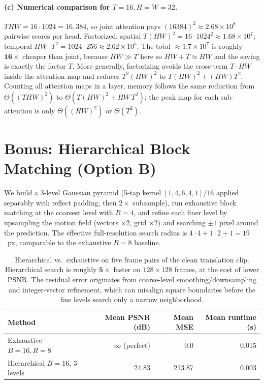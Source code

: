 \documentclass[10pt,a4paper]{article}
\begin{document}
\paragraph{(c) Numerical comparison for $T{=}16, H{=}W{=}32$.}
$THW = 16{\cdot}1024 = 16{,}384$, so joint attention pays $(16384)^2 \approx 2.68\!\times\!10^8$ pairwise scores per head. Factorized: spatial $T(HW)^2 = 16\cdot 1024^2 \approx 1.68\!\times\!10^7$; temporal $HW\cdot T^2 = 1024\cdot 256 \approx 2.62\!\times\!10^5$. The total $\approx 1.7\!\times\!10^7$ is roughly $\mathbf{16\times}$ cheaper than joint, because $HW \gg T$ here so $HW+T\approx HW$ and the saving is exactly the factor $T$. More generally, factorizing avoids the cross-term $T\cdot HW$ inside the attention map and reduces $T^2(HW)^2$ to $T(HW)^2 + (HW)T^2$. Counting all attention maps in a layer, memory follows the same reduction from $\Theta((THW)^2)$ to $\Theta(T(HW)^2 + HW\,T^2)$; the peak map for each sub-attention is only $\Theta((HW)^2)$ or $\Theta(T^2)$.

\section{Bonus: Hierarchical Block Matching (Option B)}

We build a 3-level Gaussian pyramid (5-tap kernel $[1,4,6,4,1]/16$ applied separably with reflect padding, then $2\!\times\!$ subsample), run exhaustive block matching at the coarsest level with $R{=}4$, and refine each finer level by upsampling the motion field (vectors $\times 2$, grid $\times 2$) and searching $\pm1$ pixel around the prediction. The effective full-resolution search radius is $4\!\cdot\!4 + 1\!\cdot\!2 + 1 = 19$~px, comparable to the exhaustive $R{=}8$ baseline.

\begin{table}[H]
    \centering
    \begin{tabular}{lrrr}
        \toprule
        Method & Mean PSNR (dB) & Mean MSE & Mean runtime (s) \\
        \midrule
        Exhaustive $B{=}16,R{=}8$       & $\infty$ (perfect) & 0.0  & 0.015 \\
        Hierarchical $B{=}16$, 3 levels & 24.83 & 213.87 & 0.003 \\
        \bottomrule
    \end{tabular}
    \caption{Hierarchical vs.\ exhaustive on five frame pairs of the clean translation clip. Hierarchical search is roughly $\mathbf{5\times}$ faster on $128\!\times\!128$ frames, at the cost of lower PSNR. The residual error originates from coarse-level smoothing/downsampling and integer-vector refinement, which can misalign square boundaries before the fine levels search only a narrow neighborhood.}
    \label{tab:bonus}
\end{table}
\end{document}
